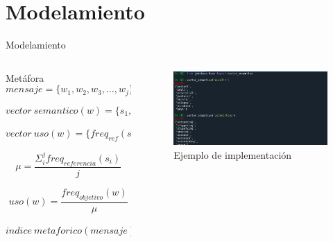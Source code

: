 \documentclass[presentation]{beamer}
\begin{document}
\section{Modelamiento}
\label{sec:orgd6d398b}
\begin{frame}[label={sec:orga33e5c4}]{Modelamiento}
\begin{columns}
\begin{column}{0.48\columnwidth}
\tiny
    \begin{block}{Metáfora}
\begin{equation}
\label{eq:mensaje}
mensaje = \{ w_1, w_2, w_3, \dots , w_j \}
\end{equation}

\begin{equation}
\label{eq:vector_semantico}
vector\ semantico(w) = \{s_1, s_2, s_3, \dots, s_j \} 
\end{equation}

\begin{equation}
\label{eq:vector_uso}
vector\ uso(w) = \{freq_{ref}(s_1),freq_{ref}(s_2),freq_{ref}(s_3), \dots, freq_{ref}(s_j) \} 
\end{equation}

\begin{equation}
\label{eq:promedio}
\mu = \frac{\Sigma_i^jfreq_{referencia}(s_i)}{j}
\end{equation}


\begin{equation}
\label{eq:uso}
uso(w) = \frac{freq_{objetivo}(w)}{\mu}
\end{equation}


\begin{equation}
\label{eq:indice_metafórico}
indice\ metaforico(mensaje) =  \Sigma_i^j uso(w_i)
\end{equation}

\end{block}
\normalsize
\end{column}
\begin{column}{0.48\columnwidth}
     \begin{figure}
\includegraphics[width=\textwidth]{./assets/codigo_vector_semantico.png}
\caption{Ejemplo de implementación}
\end{figure}


\end{column}
\end{columns}
\end{frame}
\end{document}
